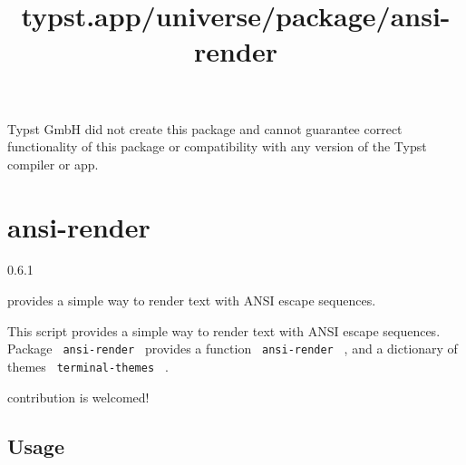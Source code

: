 Typst GmbH did not create this package and cannot guarantee correct
functionality of this package or compatibility with any version of the
Typst compiler or app.


\title{typst.app/universe/package/ansi-render}

\label{banner}
\section{ansi-render}\label{ansi-render}

{ 0.6.1 }

provides a simple way to render text with ANSI escape sequences.

\label{readme}
\href{https://github.com/8LWXpg/typst-ansi-render/tags}{}
\href{https://github.com/8LWXpg/typst-ansi-render}{}
\href{https://github.com/8LWXpg/typst-ansi-render/blob/master/LICENSE}{}
\href{https://github.com/typst/packages/tree/main/packages/preview/ansi-render}{}

This script provides a simple way to render text with ANSI escape
sequences. Package \texttt{\ ansi-render\ } provides a function
\texttt{\ ansi-render\ } , and a dictionary of themes
\texttt{\ terminal-themes\ } .

contribution is welcomed!

\subsection{Usage}\label{usage}

\begin{Shaded}
\begin{Highlighting}[]

\NormalTok{)}
\end{Highlighting}
\end{Shaded}

